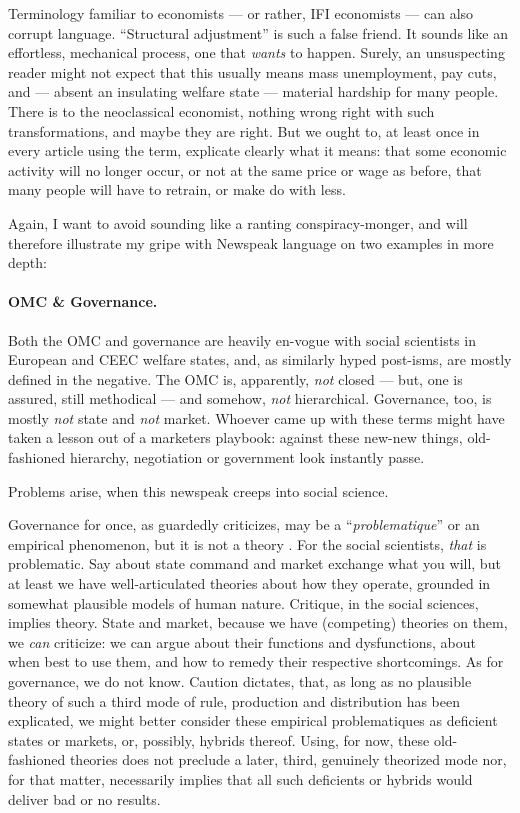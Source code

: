 Terminology familiar to economists --- or rather, \gls{IFI} economists --- can also corrupt language.
``Structural adjustment'' \citep[for example,][19]{Begg2008} is such a false friend.
It sounds like an effortless, mechanical process, one that \emph{wants} to happen.
Surely, an unsuspecting reader might not expect that this usually means mass unemployment, pay cuts, and --- absent an insulating welfare state --- material hardship for many people.
There is to the neoclassical economist, nothing wrong right with such transformations, and maybe they are right.
But we ought to, at least once in every article using the term, explicate clearly what it means:
that some economic activity will no longer occur, or not at the same price or wage as before, that many people will have to retrain, or make do with less.

Again, I want to avoid sounding like a ranting conspiracy-monger, and will therefore illustrate my gripe with Newspeak language on two examples in more depth:

\paragraph{\gls{OMC} \& Governance.}
Both the \gls{OMC} and governance are heavily en-vogue with social scientists in European and \gls{CEEC} welfare states, and, as similarly hyped post-isms, are mostly defined in the negative.
The \gls{OMC} is, apparently, \emph{not} closed --- but, one is assured, still methodical --- and somehow, \emph{not} hierarchical.
Governance, too, is mostly \emph{not} state and \emph{not} market.
Whoever came up with these terms might have taken a lesson out of a marketers playbook:
against these new-new things, old-fashioned hierarchy, negotiation or government look instantly passe.

Problems arise, when this newspeak creeps into social science.

Governance for once, as \citeauthor{Jachtenfuchs2001} guardedly criticizes, may be a ``\emph{problematique}'' or an empirical phenomenon, but it is not a theory \citeyearpar[259]{Jachtenfuchs2001}.
For the social scientists, \emph{that} is problematic.
Say about state command and market exchange what you will, but at least we have well-articulated theories about how they operate, grounded in somewhat plausible models of human nature.
Critique, in the social sciences, implies theory.
State and market, because we have (competing) theories on them, we \emph{can} criticize:
we can argue about their functions and dysfunctions, about when best to use them, and how to remedy their respective shortcomings.
As for governance, we do not know.
Caution dictates, that, as long as no plausible theory of such a third mode of rule, production and distribution has been explicated, we might better consider these empirical problematiques as deficient states or markets, or, possibly, hybrids thereof.
Using, for now, these old-fashioned theories does not preclude a later, third, genuinely theorized mode nor, for that matter, necessarily implies that all such deficients or hybrids would deliver bad or no results.

